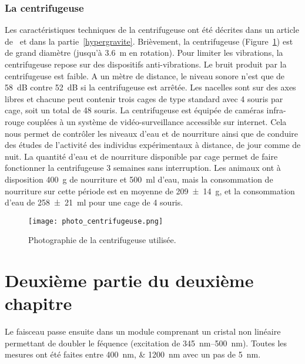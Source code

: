 		\subsubsection{La centrifugeuse}

			Les caractéristiques techniques de la centrifugeuse ont été décrites dans un article de~\cite{jamon_ground-based_2008} et dans la partie~\ref{hypergravite}. Brièvement, la centrifugeuse (Figure~\ref{photo_centrifugeuse}) est de grand diamètre (jusqu'à \SI{3.6}{\m} en rotation). Pour limiter les vibrations, la centrifugeuse repose sur des dispositifs anti-vibrations. Le bruit produit par la centrifugeuse est faible. A un mètre de distance, le niveau sonore n'est que de \SI{58}{\dB} contre \SI{52}{\dB} si la centrifugeuse est arrêtée. Les nacelles sont sur des axes libres et chacune peut contenir trois cages de type standard avec 4 souris par cage, soit un total de 48 souris. La centrifugeuse est équipée de caméras infra-rouge couplées à un système de vidéo-surveillance accessible sur internet. Cela nous permet de contrôler les niveaux d'eau et de nourriture ainsi que de conduire des études de l'activité des individus expérimentaux à distance, de jour comme de nuit. La quantité d'eau et de nourriture disponible par cage permet de faire fonctionner la centrifugeuse 3 semaines sans interruption. Les animaux ont à disposition \SI{400}{\g} de nourriture et \SI{500}{\ml} d'eau, mais la consommation de nourriture sur cette période est en moyenne de \SI{209(14)}{\g}, et la consommation d'eau de \SI{258(21)}{\ml} pour une cage de 4 souris.

			\begin{figure}[h!tbp]
				\vspace{0.5cm}
				\setcapindent{2em}
				\centering
				\texttt{[image: photo\_centrifugeuse.png]}
				\caption[Photographie de la centrifugeuse]{Photographie de la centrifugeuse utilisée.}
				\label{photo_centrifugeuse}
			\end{figure}

			\lipsum[2]

\section{Deuxième partie du deuxième chapitre}

	Le faisceau passe ensuite dans un module comprenant un cristal non linéaire permettant de doubler le féquence (excitation de \SIrange{345}{500}{\nano\meter}). Toutes les mesures ont été faites entre \SIlist{400;1200}{\nano\meter} avec un pas de \SI{5}{\nano\meter}.

